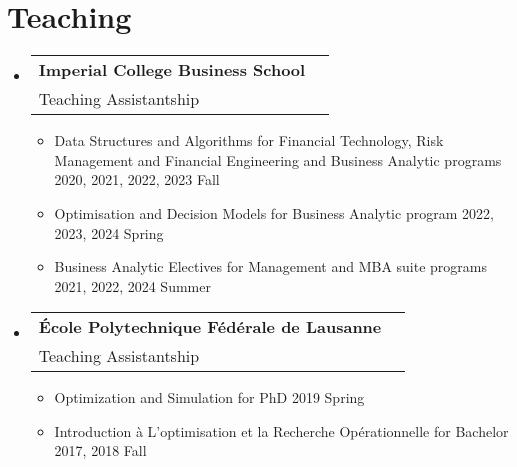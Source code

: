 \documentclass[letterpaper,11pt]{article}
\makeatletter
\newcommand{\resumeItem}[1]{
  \item\small{
    {#1 \vspace{-2pt}}
  }
}
\newcommand{\resumeSubheading}[4]{
	\vspace{-2pt}\item
	\begin{tabular*}{0.97\textwidth}[t]{l@{\extracolsep{\fill}}r}
		\textbf{#1} & #2 \\
		#3 &  #4 \\
	\end{tabular*}\vspace{-7pt}
}
\newcommand{\resumeSubHeadingListStart}{\begin{itemize}[leftmargin=0.15in, label={}]}
\newcommand{\resumeSubHeadingListEnd}{\end{itemize}}
\newcommand{\resumeItemListStart}{\begin{itemize}[label=--]}
\newcommand{\resumeItemListEnd}{\end{itemize}\vspace{-5pt}}
\makeatother
\begin{document}
\section{Teaching}
\resumeSubHeadingListStart

\resumeSubheading
{Imperial College Business School}{}
{Teaching Assistantship}{}
\resumeItemListStart
\resumeItem{{Data Structures and Algorithms for Financial Technology,  Risk Management and Financial Engineering and Business Analytic programs} \hfill 2020,  2021,  2022,  2023 Fall}
\resumeItem{{Optimisation and Decision Models for Business Analytic program} \hfill 2022,  2023, 2024 Spring}
\resumeItem{{Business Analytic Electives for Management and MBA suite programs} \hfill  2021,  2022,  2024 Summer}
\resumeItemListEnd

\resumeSubheading
{\'Ecole Polytechnique F\'ed\'erale de Lausanne}{}
{Teaching Assistantship}{}
\resumeItemListStart
\resumeItem{{Optimization and Simulation for PhD}  \hfill 2019 Spring}
\resumeItem{{Introduction \`a L'optimisation et la Recherche Op\'erationnelle for Bachelor} \hfill 2017, 2018 Fall}
\resumeSubHeadingListEnd


\resumeSubHeadingListEnd
\end{document}
